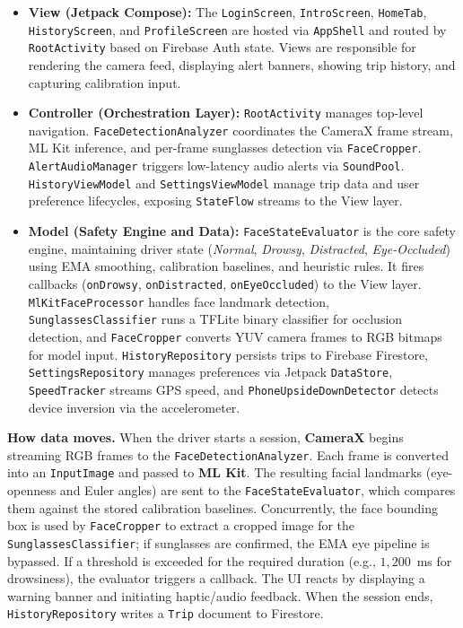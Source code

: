 \documentclass[11pt]{report}
\begin{document}
\begin{itemize}
    \item \textbf{View (Jetpack Compose):} The \texttt{LoginScreen}, \texttt{IntroScreen}, \texttt{HomeTab}, \texttt{HistoryScreen}, and \texttt{ProfileScreen} are hosted via \texttt{AppShell} and routed by \texttt{RootActivity} based on Firebase Auth state. Views are responsible for rendering the camera feed, displaying alert banners, showing trip history, and capturing calibration input.

    \item \textbf{Controller (Orchestration Layer):} \texttt{RootActivity} manages top-level navigation. \texttt{FaceDetectionAnalyzer} coordinates the CameraX frame stream, ML Kit inference, and per-frame sunglasses detection via \texttt{FaceCropper}. \texttt{AlertAudioManager} triggers low-latency audio alerts via \texttt{SoundPool}. \texttt{HistoryViewModel} and \texttt{SettingsViewModel} manage trip data and user preference lifecycles, exposing \texttt{StateFlow} streams to the View layer.

    \item \textbf{Model (Safety Engine and Data):} \texttt{FaceStateEvaluator} is the core safety engine, maintaining driver state (\textit{Normal}, \textit{Drowsy}, \textit{Distracted}, \textit{Eye-Occluded}) using EMA smoothing, calibration baselines, and heuristic rules. It fires callbacks (\texttt{onDrowsy}, \texttt{onDistracted}, \texttt{onEyeOccluded}) to the View layer. \texttt{MlKitFaceProcessor} handles face landmark detection, \texttt{SunglassesClassifier} runs a TFLite binary classifier for occlusion detection, and \texttt{FaceCropper} converts YUV camera frames to RGB bitmaps for model input. \texttt{HistoryRepository} persists trips to Firebase Firestore, \texttt{SettingsRepository} manages preferences via Jetpack \texttt{DataStore}, \texttt{SpeedTracker} streams GPS speed, and \texttt{PhoneUpsideDownDetector} detects device inversion via the accelerometer.
\end{itemize}

\noindent\textbf{How data moves.}
When the driver starts a session, \textbf{CameraX} begins streaming RGB frames to the \texttt{FaceDetectionAnalyzer}. Each frame is converted into an \texttt{InputImage} and passed to \textbf{ML Kit}.
The resulting facial landmarks (eye-openness and Euler angles) are sent to the \texttt{FaceStateEvaluator}, which compares them against the stored calibration baselines.
Concurrently, the face bounding box is used by \texttt{FaceCropper} to extract a cropped image for the \texttt{SunglassesClassifier}; if sunglasses are confirmed, the EMA eye pipeline is bypassed.
If a threshold is exceeded for the required duration (e.g., $1{,}200$~ms for drowsiness), the evaluator triggers a callback. The UI reacts by displaying a warning banner and initiating haptic/audio feedback. When the session ends, \texttt{HistoryRepository} writes a \texttt{Trip} document to Firestore.
\end{document}
